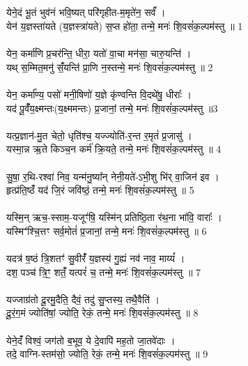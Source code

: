\subsection{}
येने॒दं भू॒तं भुव॑नं भवि॒ष्यत् परि॑गृहीत-म॒मृते॑न॒ सर्वं᳚ ।\\
येन॑ य॒ज्ञस्ता॑यते (य॒ज्ञस्त्रा॑यते) स॒प्त हो॑ता॒ तन्मे॒ मनः॑ शि॒वसं॑क॒ल्पम॑स्तु ॥ 1\\
\\
येन॒ कर्मा॑णि प्र॒चर॑न्ति॒ धीरा॒ यतो॑ वा॒चा मन॑सा॒ चारु॒यन्ति॑ ।\\
यथ् स॒म्मित॒मनु॑ संँ॒यन्ति॑ प्रा॒णि न॒स्तन्मे॒ मनः॑ शि॒वसं॑क॒ल्पम॑स्तु ॥ 2\\
\\
येन॒ कर्मा᳚ण्य॒ पसो॑ मनी॒षिणो॑ य॒ज्ञे कृ॑ण्वन्ति वि॒दथे॑षु॒ धीराः᳚ ।\\
यद॑ पू॒र्वंँय॒क्ष्मन्तः(य॒क्ष्ममन्तः) प्र॒जानां॒ तन्मे॒ मनः॑ शि॒वसं॑क॒ल्पम॑स्तु ॥3\\
\\
यत्प्र॒ज्ञान॑-मु॒त चेतो॒ धृति॑श्च॒ यज्ज्योति॑-र॒न्त र॒मृतं॑ प्र॒जासु॑ ।\\
यस्मा॒न्न ऋ॒ते किञ्च॒न कर्म॑ क्रि॒यते॒ तन्मे॒ मनः॑ शि॒वसं॑क॒ल्पम॑स्तु ॥ 4\\
\\
सु॒षा॒ र॒थि-रश्वा॑ निव॒ यन्म॑नु॒ष्या᳚न् नेनी॒यते॑-ऽभी॒शु भि॑र् वा॒जिन॑ इव ।\\
हृत्प्र॑ति॒ष्ठंँ यद॑ जि॒रं जवि॑ष्ठं॒ तन्मे॒ मनः॑ शि॒वसं॑क॒ल्पम॑स्तु ॥ 5\\
\\
यस्मि॒न् ऋच॒-स्साम॒-यजूꣳ॑षि॒ यस्मि॑न् प्रतिष्ठि॒ता र॑थ॒ना भा॑वि॒ वाराः᳚ ।\\
यस्मिꣲ॑श्चि॒त्तꣳ सर्व॒मोतं॑ प्र॒जानां॒ तन्मे॒ मनः॑ शि॒वसं॑क॒ल्पम॑स्तु ॥ 6\\
\\
यदत्र॑ ष॒ष्ठं त्रि॒शतꣳ॑ सु॒वीरंँ॑ य॒ज्ञस्य॑ गु॒ह्यं नव॑ नाव॒ माय्यं᳚ ।\\
दश॒ पञ्च॑ त्रि॒ꣳ॒ शतंँ॒ यत्परं॑ च॒ तन्मे॒ मनः॑ शि॒वसं॑क॒ल्पम॑स्तु ॥ 7\\
\\
यज्जाग्र॑तो दू॒रमु॒दैति॒ दैवं॒ तदु॑ सु॒प्तस्य॒ तथै॒वैति॑ ।\\
दू॒रं॒ग॒मं ज्योति॑षां॒ ज्योति॒ रेकं॒ तन्मे॒ मनः॑ शि॒वसं॑क॒ल्पम॑स्तु ॥ 8\\
\\
येने॒दंँ विश्वं॒ जग॑तो ब॒भूव॒ ये दे॒वापि॑ मह॒तो जा॒तवे॑दाः ।\\
तदे॒ वाग्नि-स्तम॑सो॒ ज्योति॒ रेकं॒ तन्मे॒ मनः॑ शि॒वसं॑क॒ल्पम॑स्तु ॥ 9\\
\\
